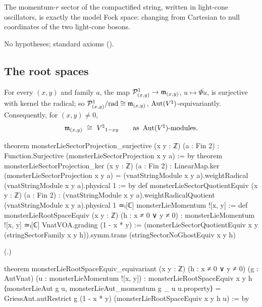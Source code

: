 \begin{physics}
The momentum-$r$ sector of the compactified string, written in light-cone oscillators, is exactly the
model Fock space: changing from Cartesian to null coordinates of the two light-cone bosons.
\end{physics}
\begin{status}No hypotheses; standard axioms ().\end{status}

\subsection{The root spaces}

\begin{theorem}\label{ch18:thm:rootspaces}
For every $(x,y)$ and family $a$, the map $\mathcal{P}^1_{(x,y)}\to\mathfrak{m}_{(x,y)}$, $u\mapsto\overline{\Psi u}$, is surjective with
kernel the radical; so $\mathcal{P}^1_{(x,y)}/\mathrm{rad}\cong\mathfrak{m}_{(x,y)}$, $\operatorname{Aut}({V^{\natural}})$-equivariantly.  Consequently, for
$(x,y)\neq0$,
\begin{equation*}
  \chXVIIIm_{(x,y)}\ \cong\ \Vnat_{1-xy}\qquad\text{as }\Aut(\Vnat)\text{-modules}.
\end{equation*}
\end{theorem}
\begin{leancode}
theorem monsterLieSectorProjection_surjective (x y : ℤ) (a : Fin 2) :
    Function.Surjective (monsterLieSectorProjection x y a) := by
theorem monsterLieSectorProjection_ker (x y : ℤ) (a : Fin 2) :
    LinearMap.ker (monsterLieSectorProjection x y a) =
      (vnatStringModule x y a).weightRadical (vnatStringModule x y a).physical 1 := by
def monsterLieSectorQuotientEquiv (x y : ℤ) (a : Fin 2) :
    (vnatStringModule x y a).weightRadicalQuotient (vnatStringModule x y a).physical 1 ≃ₗ[ℂ]
      monsterLieMomentum ![x, y] :=
def monsterLieRootSpaceEquiv (x y : ℤ) (h : x ≠ 0 ∨ y ≠ 0) :
    monsterLieMomentum ![x, y] ≃ₗ[ℂ] VnatVOA.grading (1 - x * y) :=
  (monsterLieSectorQuotientEquiv x y (stringSectorFamily x y h)).symm.trans
    (stringSectorNoGhostEquiv x y h)
\end{leancode}
(.)
\begin{leancode}
theorem monsterLieRootSpaceEquiv_equivariant (x y : ℤ) (h : x ≠ 0 ∨ y ≠ 0)
    (g : AutVnat) (u : monsterLieMomentum ![x, y]) :
    monsterLieRootSpaceEquiv x y h
      ⟨monsterLieAut g u, monsterLieAut_momentum g _ u u.property⟩ =
      GriessAut.autRestrict g (1 - x * y) (monsterLieRootSpaceEquiv x y h u) := by
\end{leancode}
